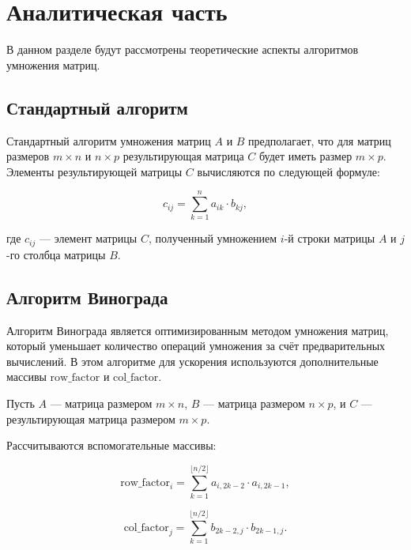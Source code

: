 \chapter{Аналитическая часть}\label{ch:-4}

В данном разделе будут рассмотрены теоретические аспекты алгоритмов умножения матриц.


\section{Стандартный алгоритм}

Стандартный алгоритм умножения матриц \( A \) и \( B \) предполагает, что для матриц размеров \( m \times n \) и \( n \times p \) результирующая матрица \( C \) будет иметь размер \( m \times p \). Элементы результирующей матрицы \( C \) вычисляются по следующей формуле:

\begin{equation}
    c_{ij} = \sum_{k=1}^{n} a_{ik} \cdot b_{kj},
\end{equation}

где \( c_{ij} \) — элемент матрицы \( C \), полученный умножением \( i \)-й строки матрицы \( A \) и \( j \)-го столбца матрицы \( B \).


\section{Алгоритм Винограда}

Алгоритм Винограда является оптимизированным методом умножения матриц, который уменьшает количество операций умножения за счёт предварительных вычислений. В этом алгоритме для ускорения используются дополнительные массивы \( \text{row\_factor} \) и \( \text{col\_factor} \).

Пусть \( A \) — матрица размером \( m \times n \), \( B \) — матрица размером \( n \times p \), и \( C \) — результирующая матрица размером \( m \times p \).

Рассчитываются вспомогательные массивы:

\begin{equation}
    \text{row\_factor}_i = \sum_{k=1}^{\lfloor n/2 \rfloor} a_{i, 2k - 2} \cdot a_{i, 2k - 1},
\end{equation}

\begin{equation}
    \text{col\_factor}_j = \sum_{k=1}^{\lfloor n/2 \rfloor} b_{2k - 2, j} \cdot b_{2k - 1, j}.
\end{equation}

